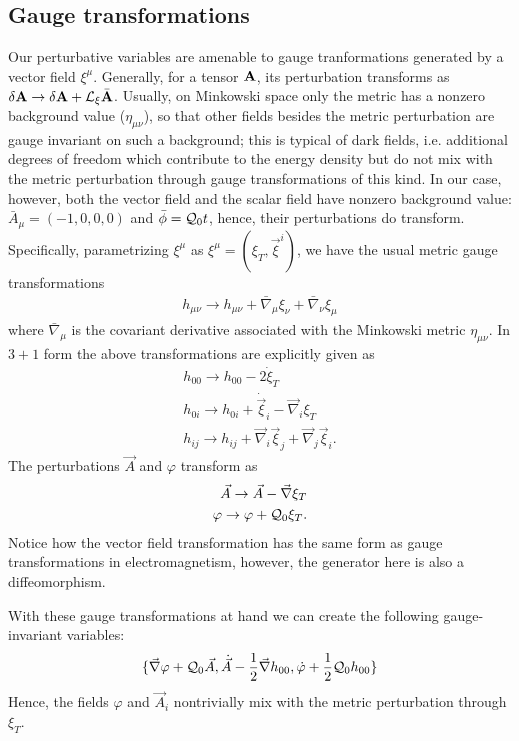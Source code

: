 \documentclass[twocolumn,prd,preprintnumbers,amsmath,amssymb,nofootinbib,superscriptaddress]{revtex4-1}
\newcommand{\Lie}[1]{\ensuremath{{\cal L}_{#1}}}
\newcommand{\nablab}{\bar{\nabla}}
\newcommand{\grad}{\ensuremath{\vec{\nabla}}}
\newcommand{\phib}{{\bar{\phi}}}
\newcommand{\Qcal}{{\cal Q}}
\begin{document}
\subsection{Gauge transformations}
Our perturbative variables are amenable to gauge tranformations generated by a vector field $\xi^\mu$. Generally, for a tensor ${\bf A}$, its perturbation transforms as
$\delta {\bf A} \rightarrow \delta {\bf A} + \Lie{\xi} \bar{{\bf A}} $. Usually, on Minkowski space only the metric has a nonzero background value ($\eta_{\mu\nu}$), so that other fields besides
the metric perturbation are gauge invariant on such a background; this is  typical of dark fields, i.e. additional degrees of freedom which contribute to the energy density but do not
mix with the metric perturbation through gauge transformations of this kind. 
In our case, however, both the vector field and the scalar field have nonzero background value: $\bar{A}_\mu = (-1,0,0,0)$ and $\phib = \Qcal_0 t$, hence, their perturbations do
transform. Specifically, parametrizing $\xi^\mu$ as $\xi^\mu = (\xi_T, \vec{\xi}^i)$, we have the usual metric gauge transformations
\begin{align}
h_{\mu\nu} \rightarrow h_{\mu\nu} + \nablab_\mu \xi_\nu + \nablab_\nu \xi_\mu 
\end{align}
where $\nablab_\mu$ is the covariant derivative associated with the Minkowski metric $\eta_{\mu\nu}$.
In $3+1$ form the above transformations are explicitly given as
\begin{align}
h_{00} \rightarrow h_{00} - 2 \dot{\xi}_T  
\\
h_{0i} \rightarrow h_{0i} + \dot{\vec{\xi}}_i - \grad_i \xi_T
\\
h_{ij} \rightarrow h_{ij} + \grad_i \vec{\xi}_j + \grad_j \vec{\xi}_i.
\end{align}
The perturbations $\vec{A}$ and $\varphi$ transform as
\begin{align}
\vec{A} \rightarrow \vec{A}  -  \grad \xi_T
\\
\varphi \rightarrow \varphi +  \Qcal_0 \xi_T.
\end{align}
Notice how the vector field transformation has the same form as gauge transformations in electromagnetism, however, the generator here is also a diffeomorphism.

With these gauge transformations at hand we can create the following gauge-invariant variables:
\begin{align}
 \{ \grad \varphi +  \Qcal_0  \vec{A}, \dot{\vec{A}} - \frac{1}{2} \grad h_{00}  , \dot{\varphi} + \frac{1}{2} \Qcal_0 h_{00}  \}
\end{align}
Hence, the fields $\varphi$ and $\vec{A}_i$ nontrivially mix with the metric perturbation through $\xi_T$.
\end{document}
